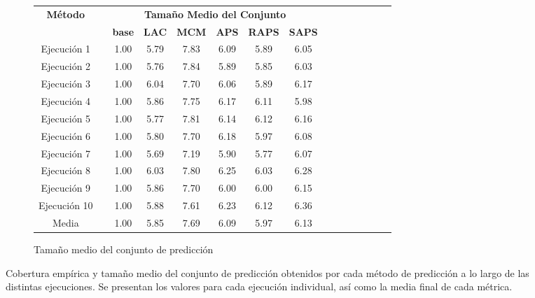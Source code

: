\begin{figure}[htbp]
\begin{subfigure}[b]{\textwidth}
        \begin{tabular}{ccccccccccccccc}
        \toprule
        \multirow{2}{*}{\textbf{Método}} &  & \multicolumn{6}{c}{\textbf{Tamaño Medio del Conjunto}} \\ \cline{3-8} 
        &  & \textbf{base} & \textbf{LAC} & \textbf{MCM} & \textbf{APS} & \textbf{RAPS} & \textbf{SAPS} \\ \cline{1-1} \cline{3-8} 
        Ejecución 1 &  & 1.00 & 5.79 & 7.83 & 6.09 & 5.89 & 6.05 \\
        Ejecución 2 &  & 1.00 & 5.76 & 7.84 & 5.89 & 5.85 & 6.03 \\
        Ejecución 3 &  & 1.00 & 6.04 & 7.70 & 6.06 & 5.89 & 6.17 \\
        Ejecución 4 &  & 1.00 & 5.86 & 7.75 & 6.17 & 6.11 & 5.98 \\
        Ejecución 5 &  & 1.00 & 5.77 & 7.81 & 6.14 & 6.12 & 6.16 \\
        Ejecución 6 &  & 1.00 & 5.80 & 7.70 & 6.18 & 5.97 & 6.08 \\
        Ejecución 7 &  & 1.00 & 5.69 & 7.19 & 5.90 & 5.77 & 6.07 \\
        Ejecución 8 &  & 1.00 & 6.03 & 7.80 & 6.25 & 6.03 & 6.28 \\
        Ejecución 9 &  & 1.00 & 5.86 & 7.70 & 6.00 & 6.00 & 6.15 \\
        Ejecución 10 &  & 1.00 & 5.88 & 7.61 & 6.23 & 6.12 & 6.36 \\ \cline{1-1} \cline{3-8} 
        Media &  & 1.00 & 5.85 & 7.69 & 6.09 & 5.97 & 6.13 \\
        \bottomrule
        \end{tabular}

        \caption{Tamaño medio del conjunto de predicción}
        \label{tab:AGG_MPSS_comparative}
    \end{subfigure}

    \caption[
        Cobertura empírica y tamaño medio del conjunto de predicción obtenidos por cada método de predicción a lo largo de las distintas ejecuciones.
    ]{   
        Cobertura empírica y tamaño medio del conjunto de predicción obtenidos por cada método de predicción a lo largo de las distintas ejecuciones. Se presentan los valores para cada ejecución individual, así como la media final de cada métrica.
    }
    \label{tab:AGC_EC_MPSS_comparative}
\end{figure}

